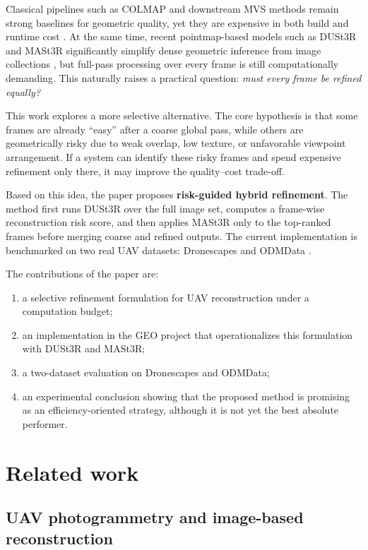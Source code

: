 \documentclass[preprint,12pt]{elsarticle}
\begin{document}
Classical pipelines such as COLMAP and downstream MVS methods remain strong baselines for geometric quality, yet they are expensive in both build and runtime cost \citep{Schonberger2016SfM}. At the same time, recent pointmap-based models such as DUSt3R and MASt3R significantly simplify dense geometric inference from image collections \citep{Wang2024DUSt3R,Leroy2024MASt3R}, but full-pass processing over every frame is still computationally demanding. This naturally raises a practical question: \textit{must every frame be refined equally?}

This work explores a more selective alternative. The core hypothesis is that some frames are already ``easy'' after a coarse global pass, while others are geometrically risky due to weak overlap, low texture, or unfavorable viewpoint arrangement. If a system can identify these risky frames and spend expensive refinement only there, it may improve the quality--cost trade-off.

Based on this idea, the paper proposes \textbf{risk-guided hybrid refinement}. The method first runs DUSt3R over the full image set, computes a frame-wise reconstruction risk score, and then applies MASt3R only to the top-ranked frames before merging coarse and refined outputs. The current implementation is benchmarked on two real UAV datasets: Dronescapes \citep{DronescapesDataset} and ODMData \citep{ODMDataBenchmarks}.

The contributions of the paper are:
\begin{enumerate}[leftmargin=1.5em]
  \item a selective refinement formulation for UAV reconstruction under a computation budget;
  \item an implementation in the GEO project that operationalizes this formulation with DUSt3R and MASt3R;
  \item a two-dataset evaluation on Dronescapes and ODMData;
  \item an experimental conclusion showing that the proposed method is promising as an efficiency-oriented strategy, although it is not yet the best absolute performer.
\end{enumerate}

\section{Related work}

\subsection{UAV photogrammetry and image-based reconstruction}
\end{document}
